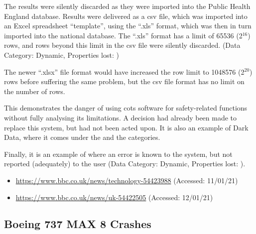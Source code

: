 The results were silently discarded as they were imported into the Public Health England \gls{database}. Results were delivered as a \gls{csv} file, which was imported into an Excel spreadsheet ``template'', using the ``.xls'' format, which was then in turn imported into the national \gls{database}. The ``.xls'' format has a limit of 65536 (2$^{16}$) rows, and rows beyond this limit in the \gls{csv} file were silently discarded. (Data Category: Dynamic, Properties lost: )

The newer ``.xlsx'' file format would have increased the row limit to 1048576 (2$^{20}$) rows before suffering the same problem, but the \gls{csv} file format has no limit on the number of rows.

This demonstrates the danger of using \gls{cots} software for safety-related functions without fully analysing its limitations. A decision had already been made to replace this system, but had not been acted upon. It is also an example of Dark Data, where it comes under the
 and the  categories.

Finally, it is an example of where an error is known to the system, but not reported (adequately) to the user (Data Category: Dynamic, Properties lost: ).

\begin{itemize}
  \item\href{https://www.bbc.co.uk/news/technology-54423988}{https://www.bbc.co.uk/news/technology-54423988} (Accessed: 11/01/21)
  \item\href{https://www.bbc.co.uk/news/uk-54422505}{https://www.bbc.co.uk/news/uk-54422505} (Accessed: 12/01/21)
\end{itemize}


\subsection{Boeing 737 MAX 8 Crashes} \label{bkm:incacc:737max8}

